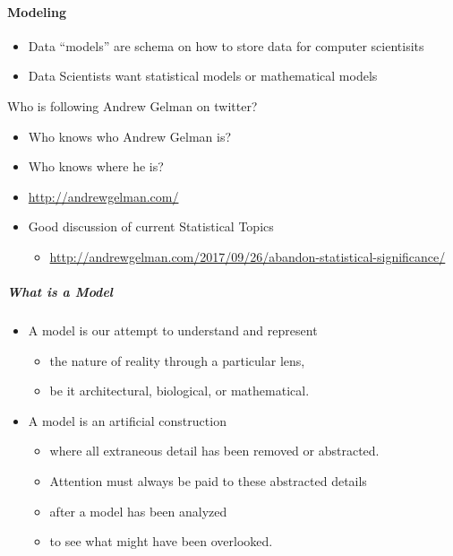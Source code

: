 \documentclass[]{article}
\providecommand{\tightlist}{%
  \setlength{\itemsep}{0pt}\setlength{\parskip}{0pt}}
\let\oldparagraph\paragraph
\renewcommand{\paragraph}[1]{\oldparagraph{#1}\mbox{}}
\let\oldsubparagraph\subparagraph
\renewcommand{\subparagraph}[1]{\oldsubparagraph{#1}\mbox{}}
\begin{document}
\paragraph{Modeling}\label{modeling}

\begin{itemize}
\tightlist
\item
  Data ``models'' are schema on how to store data for computer
  scientisits
\item
  Data Scientists want statistical models or mathematical models
\end{itemize}

Who is following Andrew Gelman on twitter?

\begin{itemize}
\tightlist
\item
  Who knows who Andrew Gelman is?
\item
  Who knows where he is?
\item
  \href{http://andrewgelman.com}{http://andrewgelman.com/}
\item
  Good discussion of current Statistical Topics

  \begin{itemize}
  \tightlist
  \item
    \url{http://andrewgelman.com/2017/09/26/abandon-statistical-significance/}
  \end{itemize}
\end{itemize}

\subparagraph{What is a Model}\label{what-is-a-model}

\begin{itemize}
\tightlist
\item
  A model is our attempt to understand and represent

  \begin{itemize}
  \tightlist
  \item
    the nature of reality through a particular lens,
  \item
    be it architectural, biological, or mathematical.
  \end{itemize}
\item
  A model is an artificial construction

  \begin{itemize}
  \tightlist
  \item
    where all extraneous detail has been removed or abstracted.
  \item
    Attention must always be paid to these abstracted details
  \item
    after a model has been analyzed
  \item
    to see what might have been overlooked.
  \end{itemize}
\end{itemize}
\end{document}
